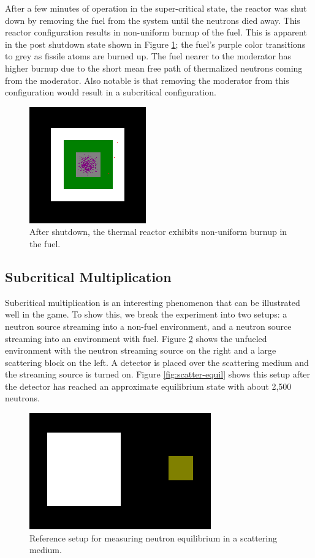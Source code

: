 \documentclass{anstrans}
\begin{document}
After a few minutes of operation in the super-critical state, the reactor was
shut down by removing the fuel from the system until the neutrons died away.
This reactor configuration results in non-uniform burnup of the fuel. This is
apparent in the post shutdown state shown in Figure \ref{fig:thermal-after};
the fuel's purple color transitions to grey as fissile atoms are burned up.
The fuel nearer to the moderator has higher burnup due to the short mean free
path of thermalized neutrons coming from the moderator.  Also notable is that
removing the moderator from this configuration would result in a subcritical
configuration. 

\begin{figure}
    \centering
    \includegraphics{reactor-thermal-after.png}
    \caption{After shutdown, the thermal reactor exhibits non-uniform burnup in the fuel. }
    \label{fig:thermal-after}
\end{figure}

\subsection{Subcritical Multiplication}

Subcritical multiplication is an interesting phenomenon that can be
illustrated well in the game.  To show this, we break the experiment into two
setups: a neutron source streaming into a non-fuel environment, and a neutron
source streaming into an environment with fuel.  Figure
\ref{fig:scatter-setup} shows the unfueled environment with the neutron
streaming source on the right and a large scattering block on the left.  A
detector is placed over the scattering medium and the streaming source is
turned on. Figure \ref{fig:scatter-equil} shows this setup after the detector
has reached an approximate equilibrium state with about 2,500 neutrons.

\begin{figure}
    \centering
    \includegraphics{scatter-setup.png}
    \caption{Reference setup for measuring neutron equilibrium in a scattering medium.}
    \label{fig:scatter-setup}
\end{figure}
\end{document}
